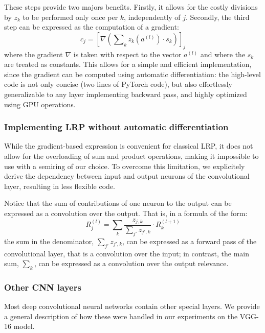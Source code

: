 \documentclass{../cs-classes/cs-classes}
\newcommand*{\1}{\digitsbb{1}}
\newcommand*{\0}{\digitsbb{0}}
\begin{document}
These steps provide two majors benefits. Firstly, it allows for the costly divisions by $z_k$ to be performed only once per $k$, independently of $j$. Secondly, the third step can be expressed as the computation of a gradient:
\begin{equation}
    c_j = \left[\nabla\left(\sum\nolimits_k z_k(a^{(l)})\cdot s_k\right)\right]_j
\end{equation}
where the gradient $\nabla$ is taken with respect to the vector $a^{(l)}$ and where the $s_k$ are treated as constants. This allows for a simple and efficient implementation, since the gradient can be computed using automatic differentiation: the high-level code is not only concise (two lines of PyTorch code), but also effortlessly generalizable  to any layer implementing backward pass, and highly optimized using GPU operations.

\subsubsection{Implementing LRP without automatic differentiation}
While the gradient-based expression is convenient for classical LRP, it does not allow for the overloading of sum and product operations, making it impossible to use with a semiring of our choice. To overcome this limitation, we explicitely derive the dependency between input and output neurons of the convolutional layer, resulting in less flexible code. 

Notice that the sum of contributions of one neuron to the output can be expressed as a convolution over the output. That is, in a formula of the form:
\begin{equation*}
    R_j^{(l)} = \sum_k \frac{z_{j,k}}{\sum_{j'}z_{j',k}} \cdot R_k^{(l+1)}
\end{equation*}
the sum in the denominator, $\sum_{j'}z_{j',k}$, can be expressed as a forward pass of the convolutional layer, that is a convolution over the input; in contrast, the main sum, $\sum_k$, can be expressed as a convolution over the output relevance.


\subsubsection{Other CNN layers}
Most deep convolutional neural networks contain other special layers. We provide a general description of how these were handled in our experiments on the VGG-16 model.
\end{document}
